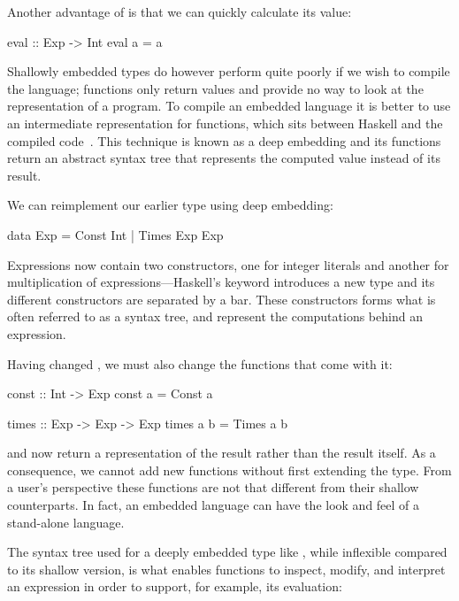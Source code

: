 \documentclass[../paper.tex]{subfiles}
\begin{document}
Another advantage of  is that we can quickly calculate its value:

\begin{code}
eval :: Exp -> Int
eval a = a
\end{code}

\noindent Shallowly embedded types do however perform quite poorly if we wish to compile the language; functions only return values and provide no way to look at the representation of a program. To compile an embedded language it is better to use an intermediate representation for functions, which sits between Haskell and the compiled code~\cite{elliott2003}. This technique is known as a deep embedding and its functions return an abstract syntax tree that represents the computed value instead of its result.

We can reimplement our earlier  type using deep embedding:

\begin{code}
data Exp = Const Int | Times Exp Exp
\end{code}

\noindent Expressions now contain two constructors, one for integer literals and another for multiplication of expressions---Haskell's  keyword introduces a new type and its different constructors are separated by a bar. These constructors forms what is often referred to as a syntax tree, and represent the computations behind an expression.

Having changed , we must also change the functions that come with it:

\begin{code}
const :: Int -> Exp
const a = Const a

times :: Exp -> Exp -> Exp
times a b = Times a b
\end{code}

\noindent {} and  now return a representation of the result rather than the result itself. As a consequence, we cannot add new functions without first extending the  type. From a user's perspective these functions are not that different from their shallow counterparts. In fact, an embedded language can have the look and feel of a stand-alone language.

The syntax tree used for a deeply embedded type like , while inflexible compared to its shallow version, is what enables functions to inspect, modify, and interpret an expression in order to support, for example, its evaluation:
\end{document}
